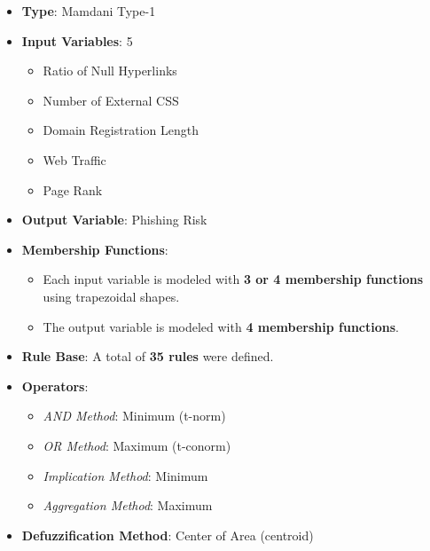 \documentclass{article}
\begin{document}
\begin{itemize}
    \item \textbf{Type}: Mamdani Type-1
    \item \textbf{Input Variables}: 5  
    \begin{itemize}
        \item Ratio of Null Hyperlinks
        \item Number of External CSS
        \item Domain Registration Length
        \item Web Traffic
        \item Page Rank
    \end{itemize}
    \item \textbf{Output Variable}: Phishing Risk
    \item \textbf{Membership Functions}:  
    \begin{itemize}
        \item Each input variable is modeled with \textbf{3 or 4 membership functions} using trapezoidal shapes.
        \item The output variable is modeled with \textbf{4 membership functions}.
    \end{itemize}
    \item \textbf{Rule Base}: A total of \textbf{35 rules} were defined.
    \item \textbf{Operators}:  
    \begin{itemize}
        \item \textit{AND Method}: Minimum (t-norm)
        \item \textit{OR Method}: Maximum (t-conorm)
        \item \textit{Implication Method}: Minimum
        \item \textit{Aggregation Method}: Maximum
    \end{itemize}
    \item \textbf{Defuzzification Method}: Center of Area (centroid)
\end{itemize}
\end{document}
